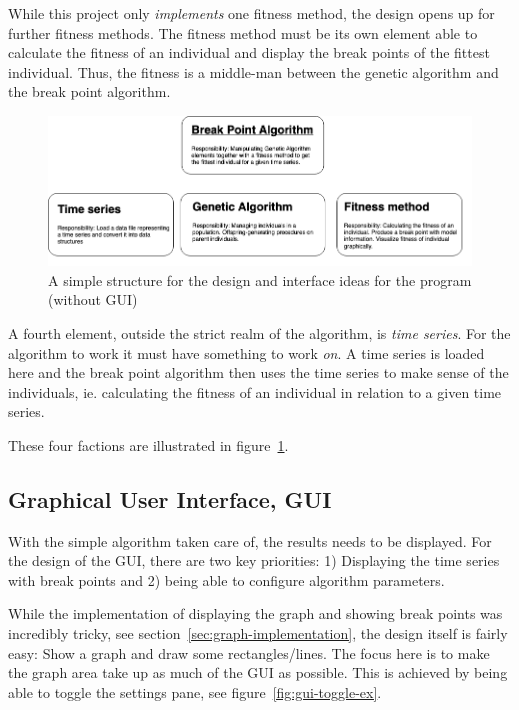 While this project only \textit{implements}
one fitness method, the design opens up for further fitness methods. The fitness
method must be its own element able to calculate the fitness of an individual
and display the break points of the fittest individual. Thus, the fitness is a
middle-man between the genetic algorithm and the break point algorithm. 

\begin{figure}[ht]
    \centering
    \includegraphics[width=\textwidth]{fig/simple-design-structure.png}
    \caption{A simple structure for the design and interface ideas for the program (without GUI)}
    \label{fig:simple-design-structure}
\end{figure}

A fourth element, outside the strict realm of the algorithm, is \textit{time
series}. For the algorithm to work it must have something to work \textit{on}. A
time series is loaded here and the break point algorithm then uses the time
series to make sense of the individuals, ie. calculating the fitness of an
individual in relation to a given time series. 

These four factions are illustrated in
figure~\ref{fig:simple-design-structure}. 


\subsection{Graphical User Interface, GUI} \label{sec:gui-design}

With the simple algorithm taken care of, the results needs to be displayed. For 
the design of the GUI, there are two key priorities: 1) Displaying the time
series with break points and 2) being able to configure algorithm parameters. 

While the implementation of displaying the graph and showing break points was incredibly tricky, see
section~\ref{sec:graph-implementation}, the design itself is fairly easy: Show a
graph and draw some rectangles/lines. The focus here is to make the graph area
take up as much of the GUI as possible. This is achieved by being able to toggle
the settings pane, see figure~\ref{fig:gui-toggle-ex}. 

